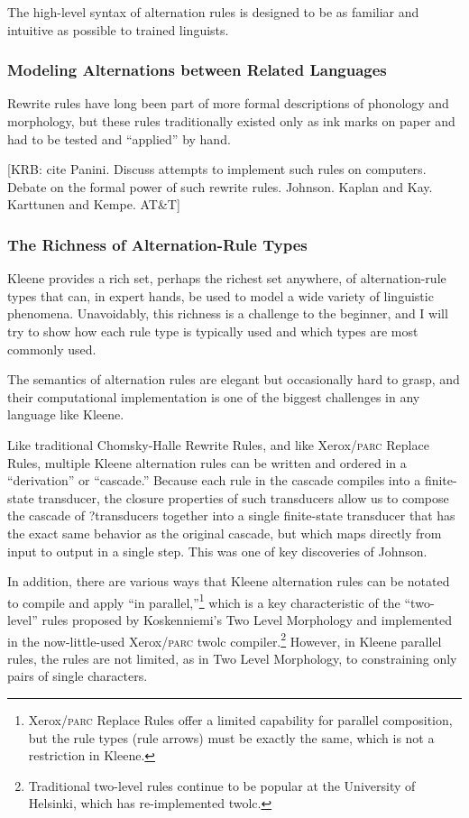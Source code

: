 \documentclass[letterpaper,12pt]{article}
\newcommand{\acro}{\textsc}
\begin{document}
The high-level syntax of alternation rules is designed to be as familiar and intuitive as possible to
trained linguists.

\subsubsection{Modeling Alternations between Related Languages}

Rewrite rules have long been part of more formal descriptions of phonology and
morphology, but these rules traditionally existed only as ink marks on paper and had to be tested
and ``applied'' by hand.  

[KRB: cite Panini.  Discuss attempts to implement such rules on computers.  Debate on the formal power of such
rewrite rules. Johnson.  Kaplan and Kay.  Karttunen and Kempe.  AT\&T]

\subsubsection{The Richness of Alternation-Rule Types}

Kleene provides a rich set, perhaps the richest set anywhere,
of alternation-rule types that can, in expert hands, be
used to model a wide variety of linguistic phenomena.  Unavoidably, this richness is a
challenge to the beginner, and I will try to show how each rule type is typically used and which
types are most commonly used.

The semantics of alternation rules are elegant but occasionally hard to grasp, and
their
computational implementation is one of the biggest challenges in any language like
Kleene.

Like traditional Chomsky-Halle Rewrite Rules, and like Xerox/\acro{parc} Replace Rules, multiple Kleene alternation rules can be
written and ordered in a ``derivation'' or ``cascade.''  Because each rule in the
cascade compiles into a finite-state transducer, the closure properties of such
transducers allow us to compose the cascade of ?transducers together into a single finite-state
transducer that has the exact same behavior as the original cascade, but which maps directly
from input to output in a single step.  This was one of key discoveries of Johnson.

In addition, there are various ways that Kleene alternation rules can be notated to compile and
apply ``in parallel,''\footnote{Xerox/\acro{parc} Replace Rules offer a limited
capability for parallel composition, but the rule types (rule arrows) must be exactly the same,
which is not a restriction in Kleene.}  which is a key characteristic of the ``two-level'' rules
proposed by Koskenniemi's Two Level Morphology and implemented in the now-little-used
Xerox/\acro{parc} twolc compiler.\footnote{Traditional two-level rules continue to be popular at the University of Helsinki, which
has re-implemented twolc.}  However, in Kleene parallel rules, the rules are
not limited, as in Two Level Morphology, to constraining only pairs of single characters.
\end{document}
